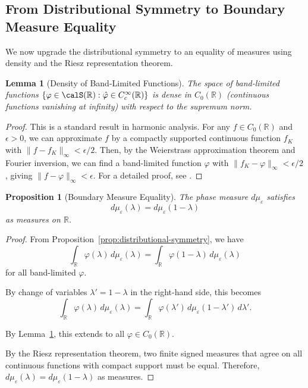 ﻿\documentclass[12pt,a4paper]{article}
\newtheorem{lemma}[theorem]{Lemma}
\newtheorem{proposition}[theorem]{Proposition}
\theoremstyle{definition}
\theoremstyle{remark}
\newcommand{\RR}{\mathbb{R}}
\begin{document}
\subsection{From Distributional Symmetry to Boundary Measure Equality}

We now upgrade the distributional symmetry to an equality of measures using density and the Riesz representation theorem.

\begin{lemma}[Density of Band-Limited Functions]
\label{lem:band-limited-density}
The space of band-limited functions $\{\varphi \in \calS(\RR) : \hat{\varphi} \in C_c^\infty(\RR)\}$ is dense in $C_0(\RR)$ (continuous functions vanishing at infinity) with respect to the supremum norm.
\end{lemma}

\begin{proof}
This is a standard result in harmonic analysis. For any $f \in C_0(\RR)$ and $\epsilon > 0$, we can approximate $f$ by a compactly supported continuous function $f_K$ with $\|f - f_K\|_\infty < \epsilon/2$. Then, by the Weierstrass approximation theorem and Fourier inversion, we can find a band-limited function $\varphi$ with $\|f_K - \varphi\|_\infty < \epsilon/2$, giving $\|f - \varphi\|_\infty < \epsilon$. For a detailed proof, see \cite[Thm.~7.2.3]{Rudin1991}.
\end{proof}

\begin{proposition}[Boundary Measure Equality]
\label{prop:boundary-measure-equality}
The phase measure $d\mu_\varepsilon$ satisfies
\[
d\mu_\varepsilon(\lambda) = d\mu_\varepsilon(1-\lambda)
\]
as measures on $\RR$.
\end{proposition}

\begin{proof}
From Proposition~\ref{prop:distributional-symmetry}, we have
\[
\int_\RR \varphi(\lambda) \, d\mu_\varepsilon(\lambda) = \int_\RR \varphi(1-\lambda) \, d\mu_\varepsilon(\lambda)
\]
for all band-limited $\varphi$.

By change of variables $\lambda' = 1-\lambda$ in the right-hand side, this becomes
\[
\int_\RR \varphi(\lambda) \, d\mu_\varepsilon(\lambda) = \int_\RR \varphi(\lambda') \, d\mu_\varepsilon(1-\lambda') \, d\lambda'.
\]

By Lemma~\ref{lem:band-limited-density}, this extends to all $\varphi \in C_0(\RR)$.

By the Riesz representation theorem, two finite signed measures that agree on all continuous functions with compact support must be equal. Therefore, $d\mu_\varepsilon(\lambda) = d\mu_\varepsilon(1-\lambda)$ as measures.
\end{proof}
\end{document}
